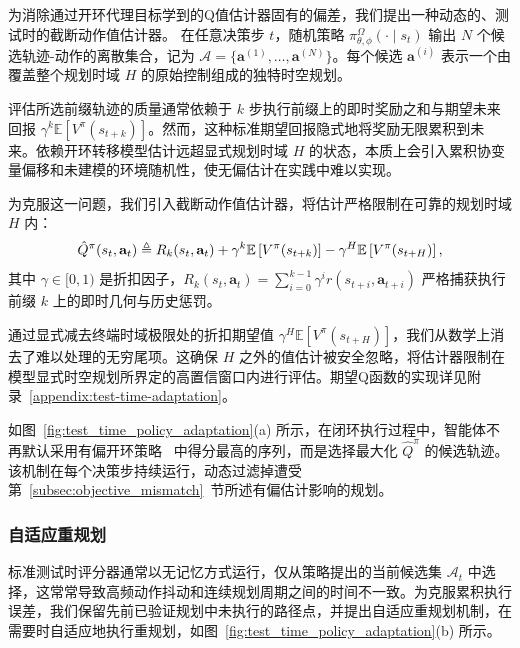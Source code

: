 \documentclass{article}
\begin{document}
为消除通过开环代理目标学到的Q值估计器固有的偏差，我们提出一种动态的、测试时的截断动作值估计器。
在任意决策步 $t$，随机策略 $\pi^{\Omega}_{\theta, \phi}(\cdot \mid s_t)$ 输出 $N$ 个候选轨迹-动作的离散集合，记为 $\mathcal{A} = \{\mathbf{a}^{(1)}, \dots, \mathbf{a}^{(N)}\}$。每个候选 $\mathbf{a}^{(i)}$ 表示一个由覆盖整个规划时域 $H$ 的原始控制组成的独特时空规划。

评估所选前缀轨迹的质量通常依赖于 $k$ 步执行前缀上的即时奖励之和与期望未来回报 $\gamma^k \mathbb{E} [ V^\pi(s_{t+k}) ]$。然而，这种标准期望回报隐式地将奖励无限累积到未来。依赖开环转移模型估计远超显式规划时域 $H$ 的状态，本质上会引入累积协变量偏移和未建模的环境随机性，使无偏估计在实践中难以实现。

为克服这一问题，我们引入截断动作值估计器，将估计严格限制在可靠的规划时域 $H$ 内：
\begin{equation}
\small
    \label{eq:q_estimator_exact}
    \hat{Q}^{\pi}(s_t, \mathbf{a}_t) \triangleq R_k(s_t, \mathbf{a}_t) + \gamma^k \mathbb{E} \left[ V^\pi(s_{t+k}) \right] - \gamma^H \mathbb{E} \left[ V^\pi(s_{t+H}) \right],
\end{equation}
其中 $\gamma \in [0, 1)$ 是折扣因子，$R_k(s_t, \mathbf{a}_t) = \sum_{i=0}^{k-1} \gamma^{i} r(s_{t+i}, \mathbf{a}_{t+i})$ 严格捕获执行前缀 $k$ 上的即时几何与历史惩罚。

通过显式减去终端时域极限处的折扣期望值 $\gamma^H \mathbb{E} [ V^\pi(s_{t+H}) ]$，我们从数学上消去了难以处理的无穷尾项。这确保 $H$ 之外的值估计被安全忽略，将估计器限制在模型显式时空规划所界定的高置信窗口内进行评估。期望Q函数的实现详见附录~\ref{appendix:test-time-adaptation}。

如图~\ref{fig:test_time_policy_adaptation}(a) 所示，在闭环执行过程中，智能体不再默认采用有偏开环策略~\cite{diffusiondrivev2, diffusiondrive} 中得分最高的序列，而是选择最大化 $\hat{Q}^{\pi}$ 的候选轨迹。该机制在每个决策步持续运行，动态过滤掉遭受第~\ref{subsec:objective_mismatch}~节所述有偏估计影响的规划。

\subsubsection{自适应重规划}
\label{subsubsec:adaptive_replan}

标准测试时评分器通常以无记忆方式运行，仅从策略提出的当前候选集 $\mathcal{A}_t$ 中选择，这常常导致高频动作抖动和连续规划周期之间的时间不一致。为克服累积执行误差，我们保留先前已验证规划中未执行的路径点，并提出自适应重规划机制，在需要时自适应地执行重规划，如图~\ref{fig:test_time_policy_adaptation}(b) 所示。
\end{document}
